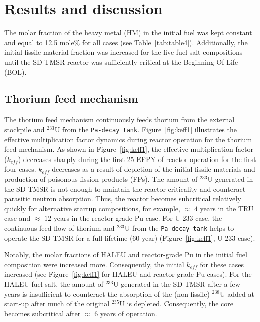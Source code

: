 \section{Results and discussion} \label{Results-and-discussion}
The molar fraction of the heavy metal (HM) 
in the initial fuel was kept constant and equal to 12.5 mole\% for all cases (see Table~\ref{tab:table4}). 
Additionally, the initial fissile material fraction was increased for the five fuel 
salt compositions until the SD-TMSR reactor was sufficiently critical at 
the Beginning Of Life (BOL).
\subsection{Thorium feed mechanism}
The thorium feed mechanism continuously feeds thorium from the external stockpile and 
$^{233}$U from the \texttt{Pa-decay tank}.
Figure~\ref{fig:keff1} illustrates the effective multiplication factor 
dynamics during reactor operation for the thorium feed mechanism. As shown in 
Figure~\ref{fig:keff1}, the effective multiplication factor ($k_{eff}$) 
decreases sharply during the first 25 \gls{EFPY} of reactor operation for the first 
four cases. $k_{eff}$ decreases as a result of depletion of the initial 
fissile materials and production of poisonous fission products (FPs). The amount of $^{233}$U generated in 
the SD-TMSR is not enough to maintain the reactor criticality and 
counteract parasitic neutron absorption. Thus, the 
reactor becomes subcritical relatively quickly for alternative startup 
compositions, for example, $\approx$ $4$ years in the \gls{TRU} case and $\approx$ $12$ 
years in the reactor-grade Pu case. For U-233 case, 
the continuous feed flow of thorium and $^{233}$U from the \texttt{Pa-decay tank} helps to operate the 
SD-TMSR for a full lifetime (60 year) (Figure~\ref{fig:keff1}, U-233 case).

Notably, the molar fractions of \gls{HALEU} and reactor-grade Pu in the initial fuel composition were increased
more. Consequently, the initial $k_{eff}$ for these cases increased (see 
Figure~\ref{fig:keff1} for HALEU and reactor-grade Pu cases).
For the HALEU fuel salt, the amount of $^{233}$U generated in the SD-TMSR after a few years is insufficient to counteract the absorption of the (non-fissile) $^{238}$U added at start-up after much of the original $^{235}$U is depleted. Consequently, the core becomes subcritical after $\approx$ $6$ years of operation.

